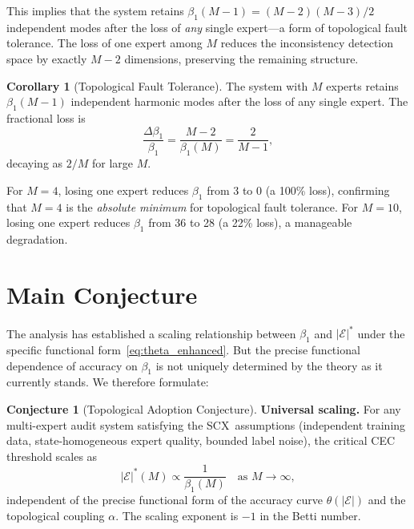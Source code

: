 \documentclass[12pt,a4paper]{article}
\theoremstyle{definition}
\newtheorem{corollary}{Corollary}[section]
\newtheorem{conjecture}{Conjecture}[section]
\theoremstyle{remark}
\theoremstyle{definition}
\newcommand{\CEC}{\mathcal{E}}
\newcommand{\SCX}{\textsf{SCX}}
\newcommand{\CECstar}{|\CEC|^*}
\begin{document}
This implies that the system retains $\beta_1(M-1) = (M-2)(M-3)/2$ independent modes after the loss of \emph{any} single expert---a form of topological fault tolerance. The loss of one expert among $M$ reduces the inconsistency detection space by exactly $M-2$ dimensions, preserving the remaining structure.

\begin{corollary}[Topological Fault Tolerance]\label{cor:fault_tolerance}
  The system with $M$ experts retains $\beta_1(M-1)$ independent harmonic modes after the loss of any single expert. The fractional loss is
  \begin{equation}
    \frac{\Delta\beta_1}{\beta_1} = \frac{M-2}{\beta_1(M)} = \frac{2}{M-1},
  \end{equation}
  decaying as $2/M$ for large $M$.
\end{corollary}

For $M=4$, losing one expert reduces $\beta_1$ from 3 to 0 (a 100\% loss), confirming that $M=4$ is the \emph{absolute minimum} for topological fault tolerance. For $M=10$, losing one expert reduces $\beta_1$ from 36 to 28 (a 22\% loss), a manageable degradation.

\section{Main Conjecture}

The analysis has established a scaling relationship between $\beta_1$ and $\CECstar$ under the specific functional form~\eqref{eq:theta_enhanced}. But the precise functional dependence of accuracy on $\beta_1$ is not uniquely determined by the theory as it currently stands. We therefore formulate:

\begin{conjecture}[Topological Adoption Conjecture]\label{conj:main}
  \textbf{Universal scaling.} For any multi-expert audit system satisfying the \SCX\ assumptions (independent training data, state-homogeneous expert quality, bounded label noise), the critical CEC threshold scales as
  \begin{equation}\label{eq:conjecture}
    \CECstar(M) \propto \frac{1}{\beta_1(M)} \quad \text{as } M \to \infty,
  \end{equation}
  independent of the precise functional form of the accuracy curve $\theta(|\CEC|)$ and the topological coupling $\alpha$. The scaling exponent is $-1$ in the Betti number.
\end{conjecture}
\end{document}
